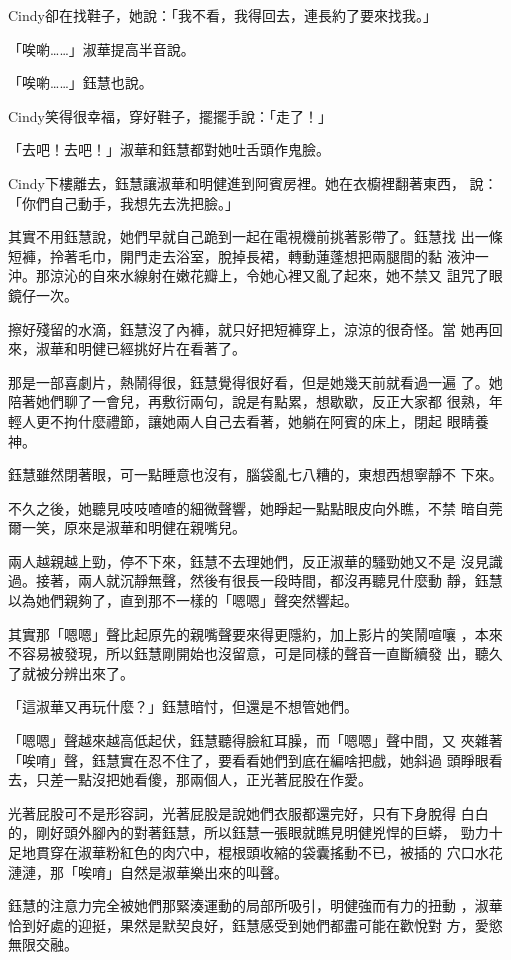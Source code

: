 Cindy卻在找鞋子，她說：「我不看，我得回去，連長約了要來找我。」

「唉喲……」淑華提高半音說。

「唉喲……」鈺慧也說。

Cindy笑得很幸福，穿好鞋子，擺擺手說：「走了！」

「去吧！去吧！」淑華和鈺慧都對她吐舌頭作鬼臉。

Cindy下樓離去，鈺慧讓淑華和明健進到阿賓房裡。她在衣櫥裡翻著東西，
說：「你們自己動手，我想先去洗把臉。」

其實不用鈺慧說，她們早就自己跪到一起在電視機前挑著影帶了。鈺慧找
出一條短褲，拎著毛巾，開門走去浴室，脫掉長裙，轉動蓮蓬想把兩腿間的黏
液沖一沖。那涼沁的自來水線射在嫩花瓣上，令她心裡又亂了起來，她不禁又
詛咒了眼鏡仔一次。

擦好殘留的水滴，鈺慧沒了內褲，就只好把短褲穿上，涼涼的很奇怪。當
她再回來，淑華和明健已經挑好片在看著了。

那是一部喜劇片，熱鬧得很，鈺慧覺得很好看，但是她幾天前就看過一遍
了。她陪著她們聊了一會兒，再敷衍兩句，說是有點累，想歇歇，反正大家都
很熟，年輕人更不拘什麼禮節，讓她兩人自己去看著，她躺在阿賓的床上，閉起
眼睛養神。

鈺慧雖然閉著眼，可一點睡意也沒有，腦袋亂七八糟的，東想西想寧靜不
下來。

不久之後，她聽見吱吱喳喳的細微聲響，她睜起一點點眼皮向外瞧，不禁
暗自莞爾一笑，原來是淑華和明健在親嘴兒。

兩人越親越上勁，停不下來，鈺慧不去理她們，反正淑華的騷勁她又不是
沒見識過。接著，兩人就沉靜無聲，然後有很長一段時間，都沒再聽見什麼動
靜，鈺慧以為她們親夠了，直到那不一樣的「嗯嗯」聲突然響起。

其實那「嗯嗯」聲比起原先的親嘴聲要來得更隱約，加上影片的笑鬧喧嚷
，本來不容易被發現，所以鈺慧剛開始也沒留意，可是同樣的聲音一直斷續發
出，聽久了就被分辨出來了。

「這淑華又再玩什麼？」鈺慧暗忖，但還是不想管她們。

「嗯嗯」聲越來越高低起伏，鈺慧聽得臉紅耳臊，而「嗯嗯」聲中間，又
夾雜著「唉唷」聲，鈺慧實在忍不住了，要看看她們到底在編啥把戲，她斜過
頭睜眼看去，只差一點沒把她看傻，那兩個人，正光著屁股在作愛。

光著屁股可不是形容詞，光著屁股是說她們衣服都還完好，只有下身脫得
白白的，剛好頭外腳內的對著鈺慧，所以鈺慧一張眼就瞧見明健兇悍的巨蟒，
勁力十足地貫穿在淑華粉紅色的肉穴中，棍根頭收縮的袋囊搖動不已，被插的
穴口水花漣漣，那「唉唷」自然是淑華樂出來的叫聲。

鈺慧的注意力完全被她們那緊湊運動的局部所吸引，明健強而有力的扭動
，淑華恰到好處的迎挺，果然是默契良好，鈺慧感受到她們都盡可能在歡悅對
方，愛慾無限交融。

